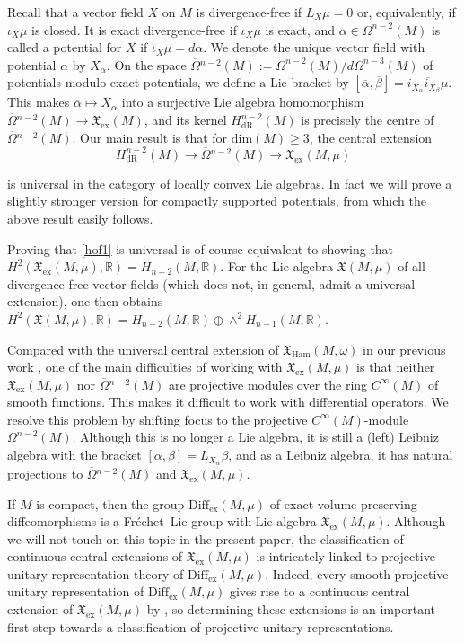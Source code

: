 \documentclass{article}
\newcommand{\ex}{\mathrm{ex}}
\newcommand{\dR}{\mathrm{dR}}
\newcommand{\fX}{\mathfrak{X}}
\newcommand{\R}{\mathbb{R}}
\newcommand{\Diff}{\mathrm{Diff}}
\newcommand{\oline}{\overline}
\theoremstyle{definition}
\begin{document}
Recall that a vector field $X$ on $M$ is divergence-free if $L_{X}\mu = 0$ or, equivalently, if $\iota_{X}\mu$ is closed. It is exact divergence-free if $\iota_{X}\mu$ is exact, and $\alpha \in \Omega^{n-2}(M)$ is called a potential for $X$ if $\iota_{X}\mu = d\alpha$. We denote the unique vector field with potential $\alpha$ by 
$X_{\alpha}$.
On the space $\oline{\Omega}{}^{n-2}(M) := \Omega^{n-2}(M)/d\Omega^{n-3}(M)$ of potentials modulo exact potentials, we define a Lie bracket by 
$[\oline{\alpha}, \oline{\beta}] = \oline{i_{X_{\alpha}} i_{X_{\beta}}\mu}$.
This makes $\oline{\alpha} \mapsto X_{\alpha}$
into a surjective Lie algebra homomorphism 
$\oline{\Omega}{}^{n-2}(M) \rightarrow \fX_{\ex}(M)$, 
and its kernel $H^{n-2}_{\dR}(M)$ is precisely the centre of $\oline{\Omega}{}^{n-2}(M)$.
Our main result is that for $\mathrm{dim}(M) \geq 3$,
 the central extension
\begin{equation}\label{hof1}
H^{n-2}_{\dR}(M) \rightarrow \oline{\Omega}{}^{n-2}(M) 
\rightarrow \fX_{\ex}(M,\mu)
\end{equation}

is universal 
in the category of locally convex Lie algebras. 
In fact we will prove a slightly stronger version for compactly supported potentials, from which the above result easily follows.

Proving that \eqref{hof1} is universal is of course equivalent to showing that $H^2(\fX_{\ex}(M,\mu), \R) = H_{n-2}(M,\R)$.
For the Lie algebra $\fX(M,\mu)$ of all divergence-free vector fields (which does not, in general, admit a universal extension),
one then obtains 
$H^2(\fX(M,\mu), \R) = H_{n-2}(M,\R) \oplus \wedge^2 H_{n-1}(M,\R)$.

Compared with the universal central extension of $\mathfrak X_{\mathrm{Ham}}(M,\omega)$ in our previous work \cite{JV16}, 
one of the main difficulties of working with $\mathfrak X_{\ex}(M,\mu)$ is that neither $\mathfrak X_{\ex}(M,\mu)$ nor 
$\oline{\Omega}{}^{n-2}(M)$ are projective modules over the ring $C^{\infty}(M)$ of smooth functions. This makes it difficult to work with differential operators. 
We resolve this problem by shifting focus to the projective $C^{\infty}(M)$-module $\Omega^{n-2}(M)$.
Although this is no longer a Lie algebra, it is still a (left) Leibniz algebra with the bracket $[\alpha,\beta] = L_{X_{\alpha}}\beta$, and as a Leibniz algebra, it has natural projections to $\oline{\Omega}{}^{n-2}(M)$ and $\mathfrak X_{\ex}(M,\mu)$.

If $M$ is compact, then the group $\Diff_{\ex}(M,\mu)$ of exact volume preserving diffeomorphisms is a Fr\'echet--Lie group with Lie algebra $\fX_{\ex}(M,\mu)$. 
Although we will not touch on this topic in the present paper,
the classification of continuous central extensions of $\fX_{\ex}(M,\mu)$ is intricately linked to projective unitary representation theory of $\Diff_{\ex}(M,\mu)$. Indeed, every smooth projective unitary representation of $\Diff_{\ex}(M,\mu)$ gives rise to a continuous central extension of $\fX_{\ex}(M,\mu)$ by \cite{JanssensNeeb2019}, so determining these extensions is an important first step towards a classification of projective unitary representations.
\end{document}
